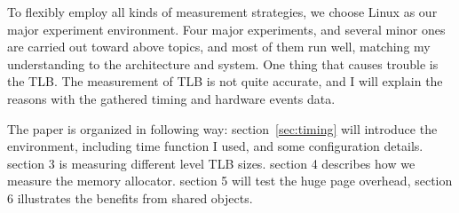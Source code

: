 To flexibly employ all kinds of measurement strategies, we choose Linux as our
major experiment environment. Four major experiments, and several minor ones
are carried out toward above topics, and most of them run well, matching my
understanding to the architecture and system. One thing that causes trouble is
the TLB. The measurement of TLB is not quite accurate, and I will explain the
reasons with the gathered timing and hardware events data.

The paper is organized in following way: section~\ref{sec:timing} will
introduce the environment, including time function I used, and some
configuration details. section 3 is measuring different level TLB sizes.
section 4 describes how we measure the memory allocator. section 5 will test
the huge page overhead, section 6 illustrates the benefits from shared objects.

